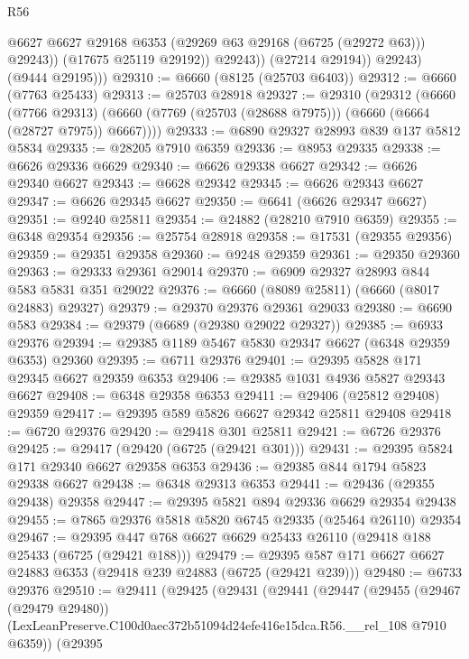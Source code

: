 \begin{lexlean}{R56}
\begin{coremodule}
                      @6627
                      @6627
                      @29168
                      @6353
                      (@29269 @63 @29168 (@6725 (@29272 @63)))
                      @29243))
                  (@17675 @25119 @29192))
                @29243))
            (@27214 @29194))
          @29243)
        (@9444 @29195)))
@29310 := @6660 (@8125 (@25703 @6403))
@29312 := @6660 (@7763 @25433)
@29313 := @25703 @28918
@29327 := @29310
    (@29312
      (@6660
        (@7766 @29313)
        (@6660 (@7769 (@25703 (@28688 @7975))) (@6660 (@6664 (@28727 @7975)) @6667))))
@29333 := @6890 @29327 @28993 @839 @137 @5812 @5834
@29335 := @28205 @7910 @6359
@29336 := @8953 @29335
@29338 := @6626 @29336 @6629
@29340 := @6626 @29338 @6627
@29342 := @6626 @29340 @6627
@29343 := @6628 @29342
@29345 := @6626 @29343 @6627
@29347 := @6626 @29345 @6627
@29350 := @6641 (@6626 @29347 @6627)
@29351 := @9240 @25811
@29354 := @24882 (@28210 @7910 @6359)
@29355 := @6348 @29354
@29356 := @25754 @28918
@29358 := @17531 (@29355 @29356)
@29359 := @29351 @29358
@29360 := @9248 @29359
@29361 := @29350 @29360
@29363 := @29333 @29361 @29014
@29370 := @6909 @29327 @28993 @844 @583 @5831 @351 @29022
@29376 := @6660 (@8089 @25811) (@6660 (@8017 @24883) @29327)
@29379 := @29370 @29376 @29361 @29033
@29380 := @6690 @583
@29384 := @29379 (@6689 (@29380 @29022 @29327))
@29385 := @6933 @29376
@29394 := @29385 @1189 @5467 @5830 @29347 @6627 (@6348 @29359 @6353) @29360
@29395 := @6711 @29376
@29401 := @29395 @5828 @171 @29345 @6627 @29359 @6353
@29406 := @29385 @1031 @4936 @5827 @29343 @6627
@29408 := @6348 @29358 @6353
@29411 := @29406 (@25812 @29408) @29359
@29417 := @29395 @589 @5826 @6627 @29342 @25811 @29408
@29418 := @6720 @29376
@29420 := @29418 @301 @25811
@29421 := @6726 @29376
@29425 := @29417 (@29420 (@6725 (@29421 @301)))
@29431 := @29395 @5824 @171 @29340 @6627 @29358 @6353
@29436 := @29385 @844 @1794 @5823 @29338 @6627
@29438 := @6348 @29313 @6353
@29441 := @29436 (@29355 @29438) @29358
@29447 := @29395 @5821 @894 @29336 @6629 @29354 @29438
@29455 := @7865 @29376 @5818 @5820 @6745 @29335 (@25464 @26110) @29354
@29467 := @29395 @447 @768 @6627 @6629 @25433 @26110 (@29418 @188 @25433 (@6725 (@29421 @188)))
@29479 := @29395 @587 @171 @6627 @6627 @24883 @6353 (@29418 @239 @24883 (@6725 (@29421 @239)))
@29480 := @6733 @29376
@29510 := @29411
    (@29425
      (@29431
        (@29441
          (@29447
            (@29455
              (@29467 (@29479 @29480))
              (LexLeanPreserve.C100d0aec372b51094d24efe416e15dca.R56.__rel_108 @7910 @6359))
            (@29395

\end{coremodule}
\end{lexlean}

